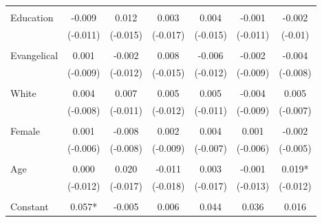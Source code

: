\documentclass[12pt]{article}
\begin{document}
\begin{appendices}
\begin{refsection}
\begin{table}[!ht]
\begin{adjustbox}{width=\textwidth,center}
\begin{tabular}{@{\extracolsep{5pt}}lcccccc}
                     &                    &          &           &                   &          &               \\
Education            & -0.009             & 0.012    & 0.003     & 0.004             & -0.001   & -0.002        \\
                     & (-0.011)           & (-0.015) & (-0.017)  & (-0.015)          & (-0.011) & (-0.01)       \\
                     &                    &          &           &                   &          &               \\
Evangelical          & 0.001              & -0.002   & 0.008     & -0.006            & -0.002   & -0.004        \\
                     & (-0.009)           & (-0.012) & (-0.015)  & (-0.012)          & (-0.009) & (-0.008)      \\
                     &                    &          &           &                   &          &               \\
White                & 0.004              & 0.007    & 0.005     & 0.005             & -0.004   & 0.005         \\
                     & (-0.008)           & (-0.011) & (-0.012)  & (-0.011)          & (-0.009) & (-0.007)      \\
                     &                    &          &           &                   &          &               \\
Female               & 0.001              & -0.008   & 0.002     & 0.004             & 0.001    & -0.002        \\
                     & (-0.006)           & (-0.008) & (-0.009)  & (-0.007)          & (-0.006) & (-0.005)      \\
                     &                    &          &           &                   &          &               \\
Age                  & 0.000              & 0.020    & -0.011    & 0.003             & -0.001   & 0.019*        \\
                     & (-0.012)           & (-0.017) & (-0.018)  & (-0.017)          & (-0.013) & (-0.012)      \\
                     &                    &          &           &                   &          &               \\
Constant             & 0.057*             & -0.005   & 0.006     & 0.044             & 0.036    & 0.016         \\

\end{tabular}
\end{adjustbox}
\end{table}
\end{refsection}
\end{appendices}
\end{document}
